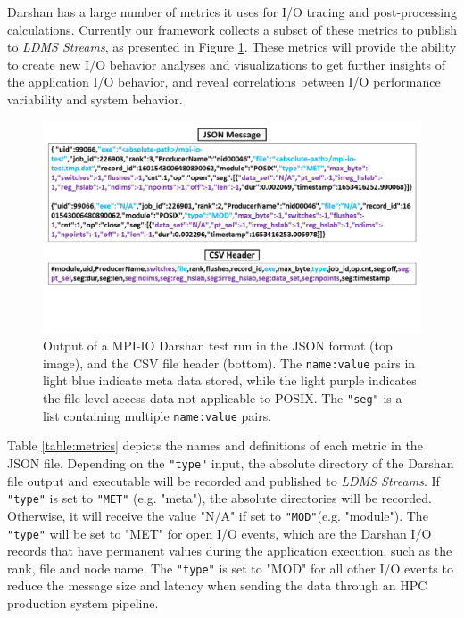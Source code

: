 Darshan has a large number of metrics it uses for I/O tracing and
post-processing calculations. Currently our framework
collects a subset of these metrics to publish to \emph{LDMS Streams},
as presented in Figure \ref{f:CSV Header and Output}. These metrics
will provide the ability to create new I/O behavior analyses and 
visualizations to get further insights of the application I/O behavior, 
and reveal correlations between I/O performance variability and system behavior.
\begin{figure}
	\centering
	\includegraphics[trim={0 3cm 0 0},clip, width=1.01\linewidth]{figs/darshan-csv-json.pdf}
	\caption{Output of a MPI-IO Darshan test run in the JSON
          format (top image), and the CSV file header (bottom). 
          The \texttt{name:value} pairs in light blue
          indicate meta data stored, while the light purple indicates
          the file level access data not applicable to POSIX.
          The \texttt{"seg"} is a list containing multiple \texttt{name:value} pairs.}
	\label{f:CSV Header and Output}
\end{figure}
Table \ref{table:metrics} depicts the names and definitions of each
metric in the JSON file. Depending on the \texttt{"type"} input, the
absolute directory of the Darshan file output and executable will be
recorded and published to \emph{LDMS Streams}. If \texttt{"type"} is
set to \texttt{"MET"} (e.g. "meta"), the absolute directories will be
recorded. Otherwise, it will receive the value "N/A" if set to
\texttt{"MOD"}(e.g. "module"). The \texttt{"type"} will be set to
"MET" for open I/O events, which are the Darshan I/O records that have
permanent values during the application execution, such as the rank,
file and node name. The \texttt{"type"} is set to "MOD" for all other
I/O events to reduce the message size and latency when sending the
data through an HPC production system pipeline.

